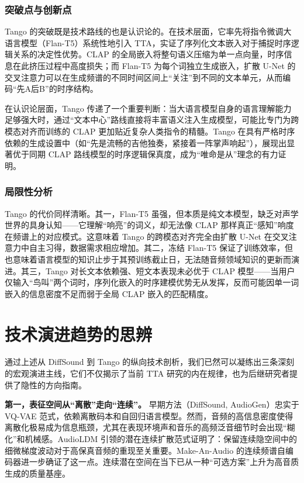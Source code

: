 \documentclass[12pt,a4paper]{article}
\begin{document}
\subsubsection{突破点与创新点}
Tango 的突破既是技术路线的也是认识论的。在技术层面，它率先将指令微调大语言模型（Flan-T5）系统性地引入 TTA，实证了序列化文本嵌入对于捕捉时序逻辑关系的决定性优势。CLAP 的全局嵌入将整句语义压缩为单一点向量，时序信息在此挤压过程中高度损失；而 Flan-T5 为每个词独立生成嵌入，扩散 U-Net 的交叉注意力可以在生成频谱的不同时间区间上“关注”到不同的文本单元，从而编码“先A后B”的时序结构。

在认识论层面，Tango 传递了一个重要判断：当大语言模型自身的语言理解能力足够强大时，通过“文本中心”路线直接将丰富语义注入生成模型，可能比专门为跨模态对齐而训练的 CLAP 更加贴近复杂人类指令的精髓。Tango 在具有严格时序依赖的生成设置中（如“先是流畅的吉他独奏，紧接着一阵掌声响起”），展现出显著优于同期 CLAP 路线模型的时序逻辑保真度，成为“唯命是从”理念的有力证明。

\subsubsection{局限性分析}
Tango 的代价同样清晰。其一，Flan-T5 虽强，但本质是纯文本模型，缺乏对声学世界的具身认知——它理解“响亮”的词义，却无法像 CLAP 那样真正“感知”响度在频谱上的对应模式。这意味着 Tango 的跨模态对齐完全由扩散 U-Net 在交叉注意力中自主习得，数据需求相应增加。其二，冻结 Flan-T5 保证了训练效率，但也意味着语言模型的知识止步于其预训练截止日，无法随音频领域知识的更新而演进。其三，Tango 对长文本依赖强、短文本表现未必优于 CLAP 模型——当用户仅输入“鸟叫”两个词时，序列化嵌入的时序建模优势无从发挥，反而可能因单一词嵌入的信息密度不足而弱于全局 CLAP 嵌入的匹配精度。
\section{技术演进趋势的思辨}

通过上述从 DiffSound 到 Tango 的纵向技术剖析，我们已然可以凝练出三条深刻的宏观演进主线，它们不仅揭示了当前 TTA 研究的内在规律，也为后继研究者提供了隐性的方向指南。

\textbf{第一，表征空间从“离散”走向“连续”。} 早期方法（DiffSound, AudioGen）忠实于 VQ-VAE 范式，依赖离散码本和自回归语言模型。然而，音频的高信息密度使得离散化极易成为信息瓶颈，尤其在表现环境声和音乐的高频泛音细节时会出现“糊化”和机械感。AudioLDM 引领的潜在连续扩散范式证明了：保留连续隐空间中的细微梯度波动对于高保真音频的重现至关重要。Make-An-Audio 的连续频谱自编码器进一步确证了这一点。连续潜在空间在当下已从一种“可选方案”上升为高音质生成的质量基座。
\end{document}
